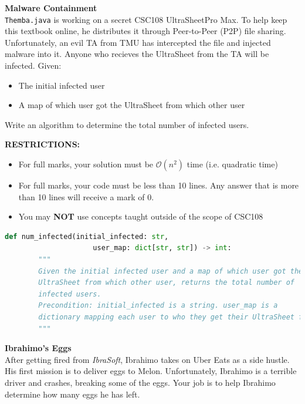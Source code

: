 \documentclass[letterpaper,13pt,addpoints]{exam}
\begin{document}
\begin{questions}
    \clearpage
    \question[10] \textbf{Malware Containment} \\
    \texttt{Themba.java} is working on a secret CSC108 UltraSheet\texttrademark  Pro Max. To help keep this textbook online, he distributes it through Peer-to-Peer (P2P) file sharing. Unfortunately, an evil TA from TMU has intercepted the file and injected malware into it. Anyone who recieves the UltraSheet from the TA will be infected. Given:
    \begin{itemize}
        \item The initial infected user
        \item A map of which user got the UltraSheet from which other user
    \end{itemize}
    Write an algorithm to determine the total number of infected users.
    \begin{center}
        \textbf{RESTRICTIONS:}
        \begin{itemize}
            \item For full marks, your solution must be $\mathcal{O}(n^2)$ time (i.e. quadratic
                  time)
            \item For full marks, your code must be less than 10 lines. Any answer that is more
                  than 10 lines will receive a mark of 0.
            \item You may \textbf{NOT} use concepts taught outside of the scope of CSC108
        \end{itemize}
    \end{center}
    \begin{lstlisting}[language=Python, style=mystyle]
    def num_infected(initial_infected: str, 
                     user_map: dict[str, str]) -> int:
        """
        Given the initial infected user and a map of which user got the 
        UltraSheet from which other user, returns the total number of 
        infected users.
        Precondition: initial_infected is a string. user_map is a 
        dictionary mapping each user to who they get their UltraSheet from
        """
    \end{lstlisting}
    \clearpage
    \question[10] \textbf{Ibrahimo's Eggs} \\
    After getting fired from \textit{IbraSoft}, Ibrahimo takes on Uber Eats as a side hustle. His first mission is to deliver eggs to Melon. Unfortunately, Ibrahimo is a terrible driver and crashes, breaking some of the eggs. Your job is to help Ibrahimo determine how many eggs he has left. \\

\end{questions}
\end{document}
